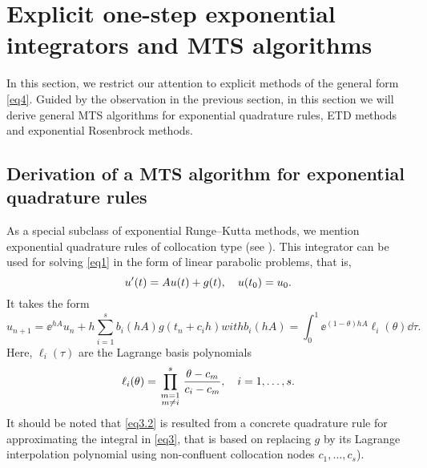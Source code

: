 \section{Explicit one-step exponential integrators and MTS algorithms}
\label{sec3}
In this section, we restrict our attention to explicit methods of the general
form \eqref{eq4}.
Guided by the observation in the previous section, in this section we will derive general MTS algorithms for exponential quadrature rules,  ETD methods and exponential Rosenbrock methods. 
\subsection{Derivation of a MTS algorithm for exponential quadrature rules}
\label{sec3.1}
As a special subclass of exponential Runge--Kutta methods, we mention exponential quadrature rules of collocation type
(see \cite{HO05a,HO10}). This integrator can be used for solving \eqref{eq1} in the form of linear parabolic problems, that is,
\begin{equation} \label{eq3.1}
u'(t)=Au(t) + g(t), \q  u(t_0)=u_0.
\end{equation}
It takes the form
\begin{subequations}\label{eq3.2}
\begin{equation} \label{eq3.2a}
u_{n+1} = \ee^{h A}u_n + h \sum_{i=1}^{s}b_{i}(h A)g(t_n +c_i h)  
\end{equation}
with 
\begin{equation} \label{eq3.2b}
b_i(hA)=\int_{0}^{1} \ee^{(1-\theta)hA} \ell_i(\theta)\dd \tau.
\end{equation}
\end{subequations}
Here, $\ell_i(\tau)$ are the Lagrange basis polynomials 
\begin{equation} \label{eq3.4}
\ell_i(\theta)=\prod_{\begin{smallmatrix}m=1\\ m\neq i \end{smallmatrix}}^{s}\frac{\theta-c_m}{c_i-c_m}, \q i=1,\ldots,s.
\end{equation}
It should be noted that \eqref{eq3.2} is resulted from a concrete quadrature rule for approximating the integral in \eqref{eq3}, that is based on replacing $g$ by its Lagrange interpolation polynomial using non-confluent collocation nodes $c_1,\ldots,c_s$).\\
